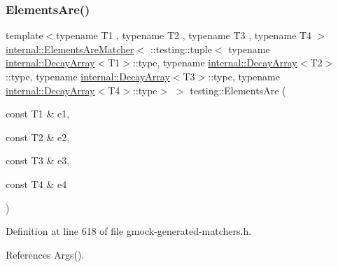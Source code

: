 \subsubsection{\texorpdfstring{Elements\+Are()}{ElementsAre()}\hspace{0.1cm}{\footnotesize\ttfamily [5/11]}}
{\footnotesize\ttfamily template$<$typename T1 , typename T2 , typename T3 , typename T4 $>$ \\
\hyperlink{classtesting_1_1internal_1_1ElementsAreMatcher}{internal\+::\+Elements\+Are\+Matcher}$<$ \+::testing\+::tuple$<$ typename \hyperlink{structtesting_1_1internal_1_1DecayArray}{internal\+::\+Decay\+Array}$<$T1$>$\+::type, typename \hyperlink{structtesting_1_1internal_1_1DecayArray}{internal\+::\+Decay\+Array}$<$T2$>$\+::type, typename \hyperlink{structtesting_1_1internal_1_1DecayArray}{internal\+::\+Decay\+Array}$<$T3$>$\+::type, typename \hyperlink{structtesting_1_1internal_1_1DecayArray}{internal\+::\+Decay\+Array}$<$T4$>$\+::type$>$ $>$ testing\+::\+Elements\+Are (\begin{DoxyParamCaption}\item[{const T1 \&}]{e1,  }\item[{const T2 \&}]{e2,  }\item[{const T3 \&}]{e3,  }\item[{const T4 \&}]{e4 }\end{DoxyParamCaption})\hspace{0.3cm}{\ttfamily [inline]}}



Definition at line 618 of file gmock-\/generated-\/matchers.\+h.



References Args().


